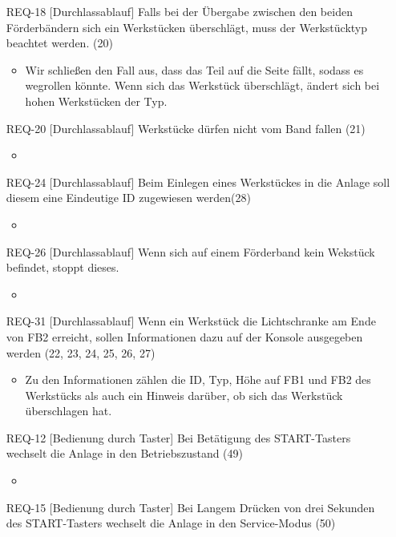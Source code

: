 \begin{itemize}
\begin{itemize}
    \end{itemize}
    \item[REQ-18][Durchlassablauf] Falls bei der Übergabe zwischen den beiden Förderbändern sich ein Werkstücken überschlägt, muss der Werkstücktyp beachtet werden. (20)
    \begin{itemize}
        \item Wir schließen den Fall aus, dass das Teil auf die Seite fällt, sodass es wegrollen könnte. Wenn sich das Werkstück überschlägt, ändert sich bei hohen Werkstücken der Typ.
    \end{itemize}
    \item[REQ-20][Durchlassablauf] Werkstücke dürfen nicht vom Band fallen (21)
    \begin{itemize}
        \item
    \end{itemize}
    \item[REQ-24][Durchlassablauf] Beim Einlegen eines Werkstückes in die Anlage soll diesem eine Eindeutige ID zugewiesen werden(28)
    \begin{itemize}
        \item
    \end{itemize}
    \item[REQ-26][Durchlassablauf] Wenn sich auf einem Förderband kein Wekstück befindet, stoppt dieses.
    \begin{itemize}
        \item
    \end{itemize}
    \item[REQ-31][Durchlassablauf] Wenn ein Werkstück die Lichtschranke am Ende von FB2 erreicht, sollen Informationen dazu auf der Konsole ausgegeben werden (22, 23, 24, 25, 26, 27)
    \begin{itemize}
        \item Zu den Informationen zählen die ID, Typ, Höhe auf FB1 und FB2 des Werkstücks als auch ein Hinweis darüber, ob sich das Werkstück überschlagen hat.
    \end{itemize}
    \item[REQ-12][Bedienung durch Taster] Bei Betätigung des START-Tasters wechselt die Anlage in den Betriebszustand (49)
    \begin{itemize}
        \item
    \end{itemize}
    \item[REQ-15][Bedienung durch Taster] Bei Langem Drücken von drei Sekunden des START-Tasters wechselt die Anlage in den Service-Modus (50)

\end{itemize}
